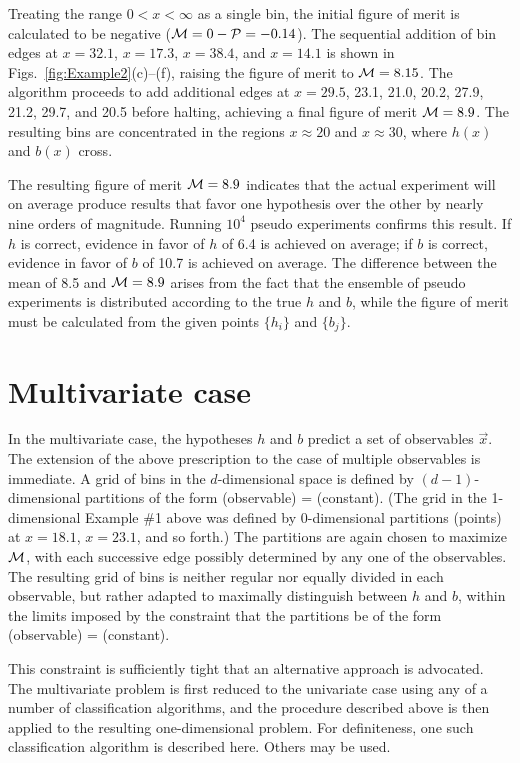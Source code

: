 \documentclass[twocolumn,twoside,prd]{revtex4} %
\begin{document}
Treating the range $0<x<\infty$ as a single bin, the initial figure of merit is calculated to be negative (${\cal M} = 0 - {\cal P} = -0.14$).  The sequential addition of bin edges at $x=32.1$, $x=17.3$, $x=38.4$, and $x=14.1$ is shown in Figs.~\ref{fig:Example2}(c)--(f), raising the figure of merit to ${\cal M} = 8.15$.  The algorithm proceeds to add additional edges at $x=29.5$, 23.1, 21.0, 20.2, 27.9, 21.2, 29.7, and 20.5 before halting, achieving a final figure of merit ${\cal M}=8.9$.  The resulting bins are concentrated in the regions $x\approx 20$ and $x\approx 30$, where $h(x)$ and $b(x)$ cross.  

The resulting figure of merit ${\cal M}=8.9$ indicates that the actual experiment will on average produce results that favor one hypothesis over the other by nearly nine orders of magnitude.  Running $10^4$ pseudo experiments confirms this result.  If $h$ is correct, evidence in favor of $h$ of 6.4 is achieved on average; if $b$ is correct, evidence in favor of $b$ of 10.7 is achieved on average.  The difference between the mean of 8.5 and ${\cal M}=8.9$ arises from the fact that the ensemble of pseudo experiments is distributed according to the true $h$ and $b$, while the figure of merit must be calculated from the given points $\{ h_i \}$ and $\{ b_j \}$. 

\section{\label{sec:MultivariateCase}Multivariate case}

In the multivariate case, the hypotheses $h$ and $b$ predict a set of observables $\vec{x}$.  The extension of the above prescription to the case of multiple observables is immediate.  A grid of bins in the $d$-dimensional space is defined by $(d-1)$-dimensional partitions of the form (observable) = (constant).  (The grid in the 1-dimensional Example \#1 above was defined by 0-dimensional partitions (points) at $x=18.1$, $x=23.1$, and so forth.)  The partitions are again chosen to maximize ${\cal M}$, with each successive edge possibly determined by any one of the observables.  The resulting grid of bins is neither regular nor equally divided in each observable, but rather adapted to maximally distinguish between $h$ and $b$, within the limits imposed by the constraint that the partitions be of the form (observable) = (constant).

This constraint is sufficiently tight that an alternative approach is advocated.  The multivariate problem is first reduced to the univariate case using any of a number of classification algorithms, and the procedure described above is then applied to the resulting one-dimensional problem.  For definiteness, one such classification algorithm is described here.  Others may be used.
\end{document}
